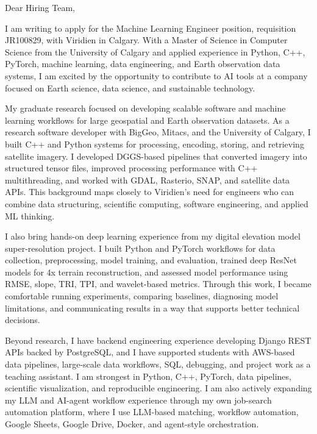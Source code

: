 \documentclass[11pt]{letter}
\begin{document}
\begin{letter}{}

\opening{Dear Hiring Team,}

I am writing to apply for the Machine Learning Engineer position, requisition JR100829, with Viridien in Calgary. With a Master of Science in Computer Science from the University of Calgary and applied experience in Python, C++, PyTorch, machine learning, data engineering, and Earth observation data systems, I am excited by the opportunity to contribute to AI tools at a company focused on Earth science, data science, and sustainable technology.

My graduate research focused on developing scalable software and machine learning workflows for large geospatial and Earth observation datasets. As a research software developer with BigGeo, Mitacs, and the University of Calgary, I built C++ and Python systems for processing, encoding, storing, and retrieving satellite imagery. I developed DGGS-based pipelines that converted imagery into structured tensor files, improved processing performance with C++ multithreading, and worked with GDAL, Rasterio, SNAP, and satellite data APIs. This background maps closely to Viridien's need for engineers who can combine data structuring, scientific computing, software engineering, and applied ML thinking.

I also bring hands-on deep learning experience from my digital elevation model super-resolution project. I built Python and PyTorch workflows for data collection, preprocessing, model training, and evaluation, trained deep ResNet models for 4x terrain reconstruction, and assessed model performance using RMSE, slope, TRI, TPI, and wavelet-based metrics. Through this work, I became comfortable running experiments, comparing baselines, diagnosing model limitations, and communicating results in a way that supports better technical decisions.

Beyond research, I have backend engineering experience developing Django REST APIs backed by PostgreSQL, and I have supported students with AWS-based data pipelines, large-scale data workflows, SQL, debugging, and project work as a teaching assistant. I am strongest in Python, C++, PyTorch, data pipelines, scientific visualization, and reproducible engineering. I am also actively expanding my LLM and AI-agent workflow experience through my own job-search automation platform, where I use LLM-based matching, workflow automation, Google Sheets, Google Drive, Docker, and agent-style orchestration.


\end{letter}
\end{document}
